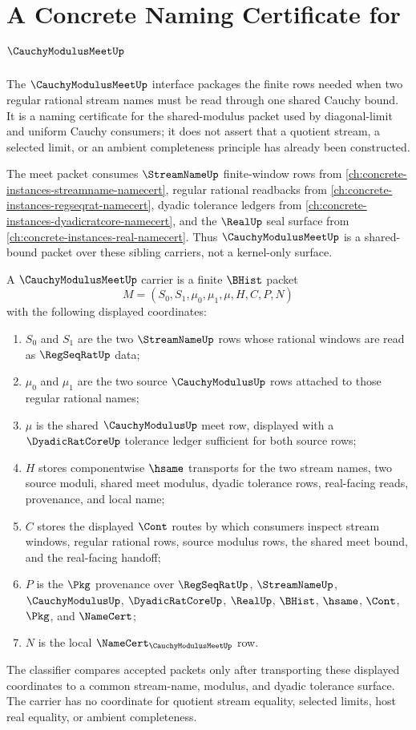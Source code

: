 \chapter{A Concrete Naming Certificate for $\CauchyModulusMeetUp$}
\label{ch:concrete-instances-cauchymodulusmeet-namecert}

The $\CauchyModulusMeetUp$ interface packages the finite rows needed when two regular rational stream names must be read through one shared Cauchy bound. It is a naming certificate for the shared-modulus packet used by diagonal-limit and uniform Cauchy consumers; it does not assert that a quotient stream, a selected limit, or an ambient completeness principle has already been constructed.

The meet packet consumes $\StreamNameUp$ finite-window rows from \autoref{ch:concrete-instances-streamname-namecert}, regular rational readbacks from \autoref{ch:concrete-instances-regseqrat-namecert}, dyadic tolerance ledgers from \autoref{ch:concrete-instances-dyadicratcore-namecert}, and the $\RealUp$ seal surface from \autoref{ch:concrete-instances-real-namecert}. Thus $\CauchyModulusMeetUp$ is a shared-bound packet over these sibling carriers, not a kernel-only surface.

\begin{definition}\label{def:cauchy-modulus-meet-carrier}
A $\CauchyModulusMeetUp$ carrier is a finite $\BHist$ packet
$$
M=(S_0,S_1,\mu_0,\mu_1,\mu,H,C,P,N)
$$
with the following displayed coordinates:
\begin{enumerate}
\item $S_0$ and $S_1$ are the two $\StreamNameUp$ rows whose rational windows are read as $\RegSeqRatUp$ data;
\item $\mu_0$ and $\mu_1$ are the two source $\CauchyModulusUp$ rows attached to those regular rational names;
\item $\mu$ is the shared $\CauchyModulusUp$ meet row, displayed with a $\DyadicRatCoreUp$ tolerance ledger sufficient for both source rows;
\item $H$ stores componentwise $\hsame$ transports for the two stream names, two source moduli, shared meet modulus, dyadic tolerance rows, real-facing reads, provenance, and local name;
\item $C$ stores the displayed $\Cont$ routes by which consumers inspect stream windows, regular rational rows, source modulus rows, the shared meet bound, and the real-facing handoff;
\item $P$ is the $\Pkg$ provenance over $\RegSeqRatUp$, $\StreamNameUp$, $\CauchyModulusUp$, $\DyadicRatCoreUp$, $\RealUp$, $\BHist$, $\hsame$, $\Cont$, $\Pkg$, and $\NameCert$;
\item $N$ is the local $\NameCert_{\CauchyModulusMeetUp}$ row.
\end{enumerate}
The classifier compares accepted packets only after transporting these displayed coordinates to a common stream-name, modulus, and dyadic tolerance surface. The carrier has no coordinate for quotient stream equality, selected limits, host real equality, or ambient completeness.
\end{definition}


